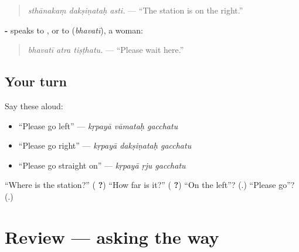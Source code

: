 \begin{quote}
\textbf{  }
\end{quote}

\begin{quote}
\emph{sthānakaṃ dakṣiṇataḥ asti.} — \textquotedblleft{}The station is on the right.\textquotedblright{}
\end{quote}

\textbf{-} speaks to \textbf{}, or to \textbf{} (\emph{bhavatī}), a woman:

\begin{quote}
\textbf{  }
\end{quote}

\begin{quote}
\emph{bhavatī atra tiṣṭhatu.} — \textquotedblleft{}Please wait here.\textquotedblright{}
\end{quote}

\subsection*{Your turn}
Say these aloud:

\begin{itemize}
\raggedright
  \item \textquotedblleft{}Please go left\textquotedblright{} — \emph{kṛpayā vāmataḥ gacchatu}
  \item \textquotedblleft{}Please go right\textquotedblright{} — \emph{kṛpayā dakṣiṇataḥ gacchatu}
  \item \textquotedblleft{}Please go straight on\textquotedblright{} — \emph{kṛpayā ṛju gacchatu}
\end{itemize}

\begin{tcolorbox}[breakable,colback=teal!4,colframe=teal!35!black,title={Before you move on}]
\textquotedblleft{}Where is the station?\textquotedblright{} (\textbf{  ?}) \textquotedblleft{}How far is it?\textquotedblright{} (\textbf{  ?}) \textquotedblleft{}On the left\textquotedblright{}? (\textbf{}.) \textquotedblleft{}Please go\textquotedblright{}? (\textbf{}.)
\end{tcolorbox}
\section[(review)]{Review — asking the way}

